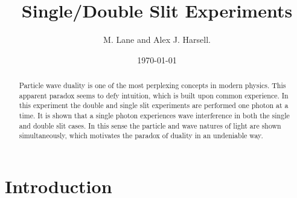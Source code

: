 \documentclass[12pt,twocolumn]{article}
\begin{document}
\title{Single/Double Slit Experiments}
\author{M. Lane and Alex J. Harsell.}
\date{\today}

\maketitle


\begin{abstract}
Particle wave duality is one of the most perplexing concepts in modern physics. This apparent
paradox seems to defy intuition, which is built upon common experience. In this experiment the
double and single slit experiments are performed one photon at a time. It is shown that a single
photon experiences wave interference in both the single and double slit cases. In this sense the
particle and wave natures of light are shown simultaneously, which motivates the paradox of duality
in an undeniable way.
\end{abstract}

\section{Introduction}
\end{document}
